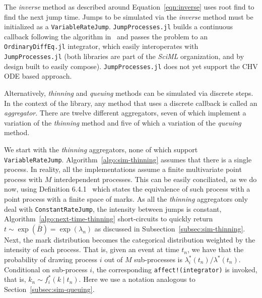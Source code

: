 \documentclass{juliacon}
\numberwithin{equation}{section}
\begin{document}
The \textit{inverse} method as described around Equation~\ref{eqn:inverse} uses root find to find the next jump time. Jumps to be simulated via the \textit{inverse} method must be initialized as a \texttt{VariableRateJump}. \texttt{JumpProcesses.jl} builds a continuous callback following the algorithm in~\cite{salis2005} and passes the problem to an \texttt{OrdinaryDiffEq.jl} integrator, which easily interoperates with \texttt{JumpProcesses.jl} (both libraries are part of the \textit{SciML} organization, and by design built to easily compose). \texttt{JumpProcesses.jl} does not yet support the CHV ODE based approach.

Alternatively, \textit{thinning} and \textit{queuing} methods can be simulated via discrete steps. In the context of the library, any method that uses a discrete callback is called an \textit{aggregator}. There are twelve different aggregators, seven of which implement a variation of the \textit{thinning} method and five of which a variation of the \textit{queuing} method.

We start with the \textit{thinning} aggregators, none of which support \texttt{VariableRateJump}. Algorithm~\ref{algo:sim-thinning} assumes that there is a single process. In reality, all the implementations assume a finite multivariate point process with \( M \) interdependent processes. This can be easily conciliated, as we do now, using Definition 6.4.1~\cite{daley2003} which states the equivalence of such process with a point process with a finite space of marks. As all the \textit{thinning} aggregators only deal with \texttt{ConstantRateJump}, the intensity between jumps is constant, Algorithm~\ref{algo:next-time-thinning} short-circuits to quickly return \( t \sim \exp(\bar{B}) = \exp(\lambda_n) \) as discussed in Subsection~\ref{subsec:sim-thinning}. Next, the mark distribution becomes the categorical distribution weighted by the intensity of each process. That is, given an event at time \( t_n \), we have that the probability of drawing process \( i \) out of \( M \) sub-processes is \( \lambda_i^\ast (t_n)  / \lambda^\ast (t_n) \). Conditional on sub-process \( i \), the corresponding \texttt{affect!(integrator)} is invoked, that is, \( k_n \sim f_i^\ast (k \mid t_n) \). Here we use a notation analogous to Section~\ref{subsec:sim-queuing}.
\end{document}
